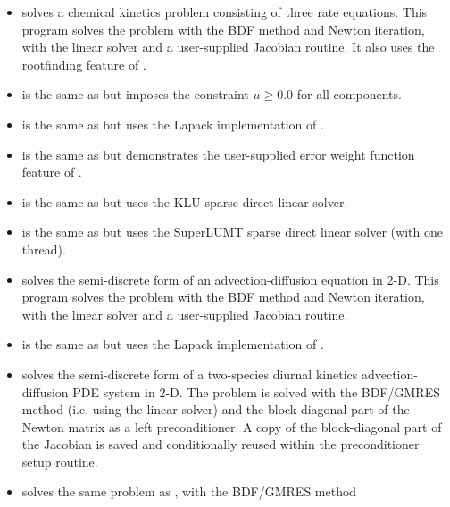 \begin{itemize}


\item {}
  solves a chemical kinetics problem consisting of three rate equations.
  \newline
  This program solves the problem with the BDF method and Newton          
  iteration, with the {\cvdense} linear solver and a user-supplied    
  Jacobian routine.  It also uses the rootfinding feature of {\cvodes}.
\item {}
  is the same as  but imposes the constraint
  $u \geq 0.0$ for all components.
\item {}
  is the same as  but uses the Lapack implementation of {\cvdense}.
\item {}
  is the same as  but demonstrates the user-supplied error
  weight function feature of {\cvodes}.
\item {}
  is the same as  but uses the KLU sparse direct linear solver.
\item {}
  is the same as  but uses the SuperLUMT sparse direct linear solver
  (with one thread).
\item {}
  solves the semi-discrete form of an advection-diffusion equation in 2-D. 
  \newline
  This program solves the problem with the BDF method and Newton          
  iteration, with the {\cvband} linear solver and a user-supplied     
  Jacobian routine.
\item {}
  is the same as  but uses the Lapack implementation of {\cvband}.
\item {}
  solves the semi-discrete form of a two-species diurnal kinetics
  advection-diffusion PDE system in 2-D.
  \newline
  The problem is solved with the BDF/GMRES method (i.e.    
  using the {\cvspgmr} linear solver) and the block-diagonal part of the  
  Newton matrix as a left preconditioner. A copy of the block-diagonal 
  part of the Jacobian is saved and conditionally reused within the    
  preconditioner setup routine.
\item {}
  solves the same problem as , with the BDF/GMRES method 

\end{itemize}
